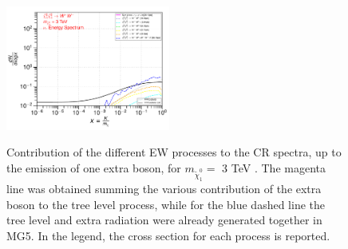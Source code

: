 \documentclass[epj,nopacs,fleqn]{svjour}
\begin{document}
\begin{figure}[!h]
	\subfigure
	{\includegraphics[width=0.48\textwidth]{Fig/n1ww_comparison/3000_neutrinos_tau_n1ww_comparison.pdf} }
	
	\caption{Contribution of the different EW processes to the CR spectra, up to the emission of one extra boson, for $m_{\tilde \chi_1 ^0}=$ 3 TeV . The magenta line was obtained summing the various contribution of the extra boson to the tree level process, while for the blue dashed line the tree level and extra radiation were already generated together in MG5. In the legend, the cross section for each process is reported.}
	\label{ew_comparison_2}
\end{figure}
\end{document}

